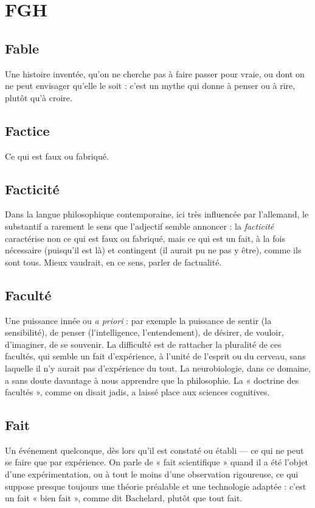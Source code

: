 
\chapter{FGH}
\section{Fable}
Une histoire inventée, qu’on ne cherche pas à faire passer pour vraie,
ou dont on ne peut envisager qu’elle le soit : c’est un mythe qui
donne à penser ou à rire, plutôt qu’à croire.

\section{Factice}
Ce qui est faux ou fabriqué.

\section{Facticité}
Dans la langue philosophique contemporaine, ici très influencée
par l’allemand, le substantif a rarement le sens que l’adjectif
semble annoncer : la {\it facticité} caractérise non ce qui est faux ou fabriqué, mais ce
qui est un fait, à la fois nécessaire (puisqu'il est là) et contingent (il aurait pu ne
pas y être), comme ils sont tous. Mieux vaudrait, en ce sens, parler de factualité.

\section{Faculté}
Une puissance innée ou {\it a priori} : par exemple la puissance de
sentir (la sensibilité), de penser (l'intelligence, l’entendement), de
désirer, de vouloir, d'imaginer, de se souvenir. La difficulté est de rattacher la pluralité
de ces facultés, qui semble un fait d'expérience, à l’unité de l'esprit ou du cerveau,
sans laquelle il n’y aurait pas d’expérience du tout. La neurobiologie, dans ce
domaine, a sans doute davantage à nous apprendre que la philosophie. La « doctrine
des facultés », comme on disait jadis, a laissé place aux sciences cognitives.

\section{Fait}
Un événement quelconque, dès lors qu’il est constaté ou établi — ce
qui ne peut se faire que par expérience. On parle de « fait scientifique »
quand il a été l’objet d’une expérimentation, ou à tout le moins d’une observation
rigoureuse, ce qui suppose presque toujours une théorie préalable et une
technologie adaptée : c’est un fait « bien fait », comme dit Bachelard, plutôt
que tout fait.

